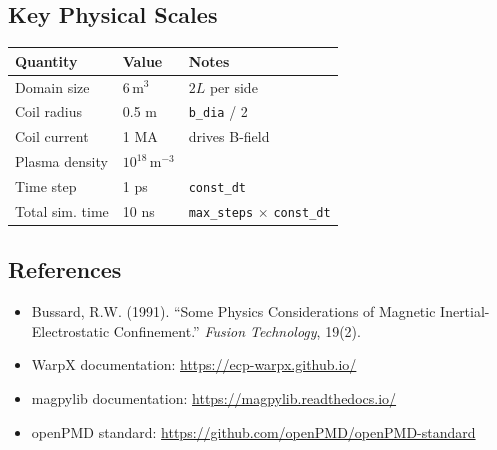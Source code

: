 \documentclass[11pt, a4paper]{article}
\begin{document}
\subsection{Key Physical Scales}

\begin{longtable}{L{4cm} L{4cm} L{6cm}}
\toprule
\textbf{Quantity} & \textbf{Value} & \textbf{Notes} \\
\midrule
Domain size       & $6\,\mathrm{m}^3$   & $2L$ per side \\
Coil radius       & 0.5 m              & \texttt{b\_dia} / 2 \\
Coil current      & 1 MA               & drives B-field \\
Plasma density    & $10^{18}\,\mathrm{m}^{-3}$ & \\
Time step         & 1 ps               & \texttt{const\_dt} \\
Total sim. time   & 10 ns              & \texttt{max\_steps} $\times$ \texttt{const\_dt} \\
\bottomrule
\end{longtable}

\subsection{References}

\begin{itemize}
    \item Bussard, R.W. (1991). ``Some Physics Considerations of Magnetic
          Inertial-Electrostatic Confinement.'' \textit{Fusion Technology}, 19(2).
    \item WarpX documentation: \url{https://ecp-warpx.github.io/}
    \item magpylib documentation: \url{https://magpylib.readthedocs.io/}
    \item openPMD standard: \url{https://github.com/openPMD/openPMD-standard}
\end{itemize}
\end{document}

